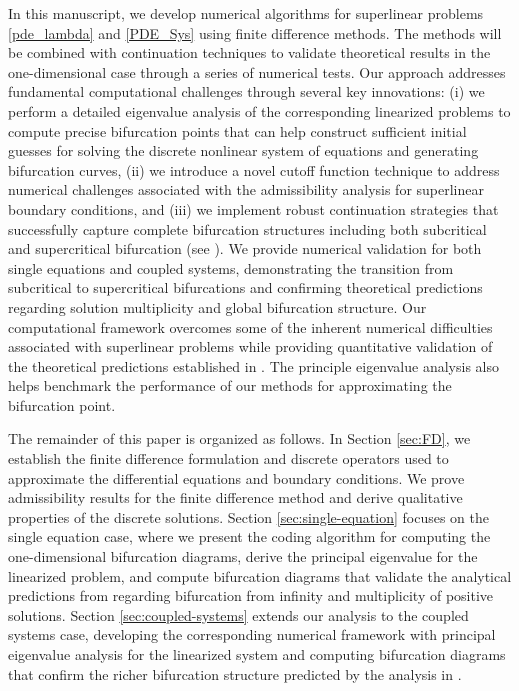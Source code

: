 \documentclass[12pt, reqno]{amsart}
\numberwithin{equation}{section}
\begin{document}
In this manuscript, we develop numerical algorithms for superlinear problems \eqref{pde_lambda} and \eqref{PDE_Sys} using finite difference methods.  The methods will be combined with continuation techniques to validate theoretical results in the one-dimensional case through a series of numerical tests. Our approach addresses fundamental computational challenges through several key innovations: (i) we perform a detailed eigenvalue analysis of the corresponding linearized problems to compute precise bifurcation points that can help construct sufficient initial guesses for solving the discrete nonlinear system of equations and generating bifurcation curves, (ii) we introduce a novel cutoff function technique to address numerical challenges associated with the admissibility analysis for superlinear boundary conditions, and (iii) we implement robust continuation strategies that successfully capture complete bifurcation structures including both subcritical and supercritical bifurcation (see \cite[Thm. 4.4]{BCDMP_2024}). We provide numerical validation for both single equations and coupled systems, demonstrating the transition from subcritical to supercritical bifurcations and confirming theoretical predictions regarding solution multiplicity and global bifurcation structure. Our computational framework overcomes some of the inherent numerical difficulties associated with superlinear problems while providing quantitative validation of the theoretical predictions established in \cite{BCDMP_2024, BCDMP_Systems}.  The principle eigenvalue analysis also helps benchmark the performance of our methods for approximating the bifurcation point.  


The remainder of this paper is organized as follows. In Section \ref{sec:FD}, we establish the finite difference formulation and discrete operators used to approximate the differential equations and boundary conditions.  We prove admissibility results for the finite difference method and derive qualitative properties of the discrete solutions. Section \ref{sec:single-equation} focuses on the single equation case, where we present the coding algorithm for computing the one-dimensional bifurcation diagrams, derive the principal eigenvalue for the linearized problem, and compute bifurcation diagrams that validate the analytical predictions from \cite{BCDMP_2024} regarding bifurcation from infinity and multiplicity of positive solutions. Section \ref{sec:coupled-systems} extends our analysis to the coupled systems case, developing the corresponding numerical framework with principal eigenvalue analysis for the linearized system and computing bifurcation diagrams that confirm the richer bifurcation structure predicted by the analysis in \cite{BCDMP_Systems}.
\end{document}
